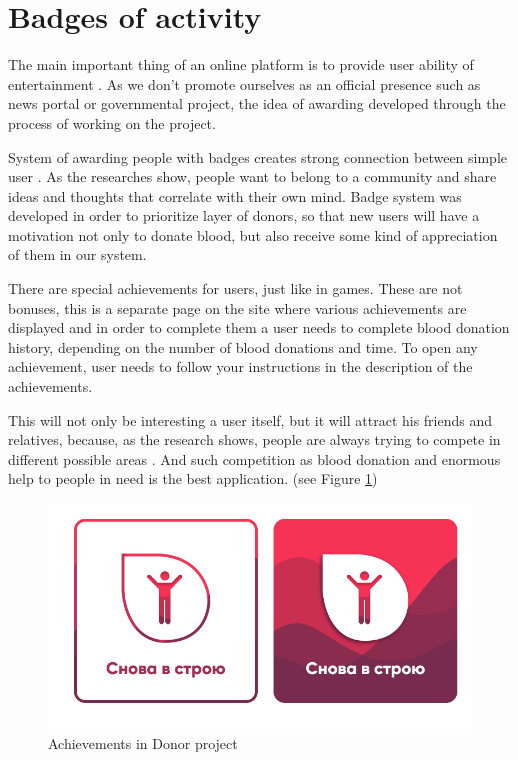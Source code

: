 \section{Badges of activity}
The main important thing of an online platform is to provide user ability of entertainment \cite{macarthy}. As we don't promote ourselves as an official presence such as news portal or governmental project, the idea of awarding developed through the process of working on the project. 
\par
System of awarding people with badges creates strong connection between simple user \cite{eyal}. As the researches show, people want to belong to a community and share ideas and thoughts that correlate with their own mind. Badge system was developed in order to prioritize layer of donors, so that new users will have a motivation not only to donate blood, but also receive some kind of appreciation of them in our system.
\par
There are special achievements for users, just like in games. These are not bonuses, this is a separate page on the site where various achievements are displayed and in order to complete them a user needs to complete blood donation history, depending on the number of blood donations and time. To open any achievement, user needs to follow your instructions in the description of the achievements.
\par
This will not only be interesting a user itself, but it will attract his friends and relatives, because, as the research shows, people are always trying to compete in different possible areas \cite{eyal}. And such competition as blood donation and enormous help to people in need is the best application.
(see Figure \ref{fig:achievements})

\begin{figure}[h]
    \centering
    \includegraphics[scale=0.4]{figures/9.png}
    \caption{Achievements in Donor project}
    \label{fig:achievements}
\end{figure}
